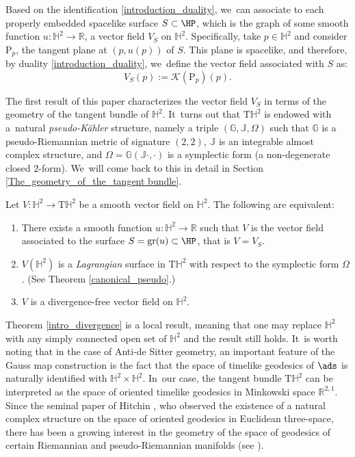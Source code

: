 Based on the identification \eqref{introduction_duality}, we~can associate to each properly embedded spacelike surface \(S \subset \HP\), which is the graph of some smooth function \(u: \mathbb{H}^2 \to \mathbb{R}\), a vector field \(V_S\) on \(\mathbb{H}^2\). Specifically, take \(p \in \mathbb{H}^2\) and consider \(\mathrm{P}_p\), the tangent plane at \((p,u(p))\) of \(S\). This plane is spacelike, and therefore, by duality \eqref{introduction_duality}, we~define the vector field associated with \(S\) as:
\begin{equation}\label{2}
V_S(p):=\mathcal{K}(\mathrm{P}_p)(p).
\end{equation}

The first result of this paper characterizes the vector field \(V_S\) in terms of the geometry of the tangent bundle of \(\mathbb{H}^2\). It~turns out that \(\mathrm{T}\mathbb{H}^2\) is endowed with a~natural \emph{pseudo-Kähler} structure, namely a triple \((\mathbb{G}, \mathbb{J}, \Omega)\) such that \(\mathbb{G}\) is a pseudo-Riemannian metric of signature \((2,2)\), \(\mathbb{J}\) is an integrable almost complex structure, and \(\Omega = \mathbb{G}(\mathbb{J} \cdot, \cdot)\) is a symplectic form (a non-degenerate closed $2$-form). We~will come back to this in detail in Section \ref{The_geometry_of_the_tangent bundle}.
\begin{theorem}\label{intro_divergence}
Let \(V: \mathbb{H}^2 \to \mathrm{T}\mathbb{H}^2\) be a smooth vector field on \(\mathbb{H}^2\). The following are equivalent:
\begin{enumerate}
\item There exists a smooth function \(u: \mathbb{H}^2 \to \mathbb{R}\) such that \(V\) is the vector field associated to the surface \(S = \mathrm{gr}(u) \subset \HP\), that is \(V = V_S\).
\item \(V(\mathbb{H}^2)\) is a \emph{Lagrangian} surface in \(\mathrm{T}\mathbb{H}^2\) with respect to the symplectic form \(\Omega\). (See Theorem \ref{canonical_pseudo}.)
\item \(V\) is a divergence-free vector field on \(\mathbb{H}^2\).
\end{enumerate}
\end{theorem}

Theorem \ref{intro_divergence} is a local result, meaning that one may replace $\mathbb{H}^2$ with any simply connected open set of $\mathbb{H}^2$ and the result still holds. It~is worth noting that in the case of Anti-de Sitter geometry, an important feature of the Gauss map construction is the fact that the space of timelike geodesics of \(\ads\) is naturally identified with \(\mathbb{H}^2 \times \mathbb{H}^2\). In~our case, the tangent bundle \(\mathrm{T}\mathbb{H}^2\) can be interpreted as the space of oriented timelike geodesics in Minkowski space \(\mathbb{R}^{2,1}\). Since the seminal paper of Hitchin \cite{Monopole_Hitchin}, who observed the existence of a natural complex structure on the space of oriented geodesics in Euclidean three-space, there has been a growing interest in the geometry of the space of geodesics of certain Riemannian and pseudo-Riemannian manifolds (see \cite{An_indi_Kaehler,Anciaux_space_of_geodesic,Salvai_Godoy_smooth_foliation,ML_in_tangent_bundle,Bon_Emam,Emam_Seppi1}).

